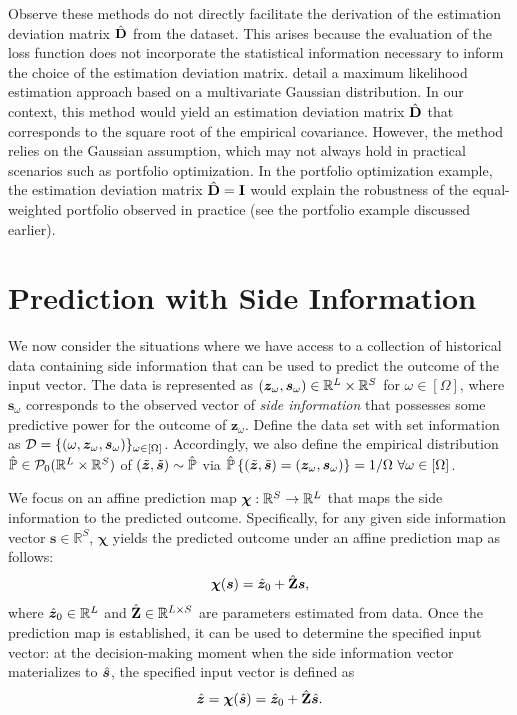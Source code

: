 \documentclass[opre, nonblindrev]{informswp}
\newcommand{\1}[1]{\mathds{1}{\left(#1\right)}}
\begin{document}
Observe these methods do not directly facilitate the derivation of the estimation deviation matrix ${\hat{\mathbf{D}}}$ from the dataset. This arises because the evaluation of the loss function does not incorporate the statistical information necessary to inform the choice of the estimation deviation matrix. \cite{Zhu_Xie_Sim_2021joint} detail a maximum likelihood estimation approach based on a multivariate Gaussian distribution. In our context, this method would yield an estimation deviation matrix ${\hat{\mathbf{D}}}$ that corresponds to the square root of the empirical covariance. However, the method relies on the Gaussian assumption, which may not always hold in practical scenarios such as portfolio optimization. In the portfolio optimization example, the estimation deviation matrix ${\hat{\mathbf{D}}} = {\mathbf{I}}$ would explain the robustness of the equal-weighted portfolio observed in practice (see the portfolio example discussed earlier).

\section{Prediction with Side Information}
\label{sec:prediction_with_side_info}

We now consider the situations where we have access to a collection of historical data containing side information that can be used to predict the outcome of the input vector. The data is represented as $(\bm{z}_\omega, \bm s_\omega) \in \mathbb{R}^L \times \mathbb{R}^S$ for $\omega \in [\Omega]$, where $\bm{s}_\omega$ corresponds to the observed vector of \textit{side information} that possesses some predictive power for the outcome of $\bm z_\omega$. Define the data set with set information as $\mathcal{D} = \{(\omega,\bm z_\omega,\bm s_\omega)\}_{\omega  \in [\Omega]}$. Accordingly, we also define the empirical distribution $\hat{\mathbb{P}} \in \mathcal{P}_0(\mathbb{R}^L\times \mathbb{R}^S )$ of $(\tilde{\bm{z}},\tilde{\bm{s}}) \sim \hat{\mathbb{P}}$ via $\hat{\mathbb{P}}\left\{(\tilde{\bm{z}},\tilde{\bm{s}}) = (\bm z_\omega,\bm s_\omega) \right\} = 1/\Omega ~\forall \omega  \in [\Omega]$. 

We focus on an affine prediction map $\bm \chi:\mathbb{R}^S\rightarrow \mathbb{R}^L$ that maps the side information to the predicted outcome. Specifically, for any given side information vector $\bm s \in \mathbb{R}^S$, $\bm \chi$ yields the predicted outcome under an affine prediction map as follows:
$$
\bm \chi(\bm s) = \hat{\bm{z}}_0 + {\hat{\mathbf{Z}}} \bm s,
$$ 
where $\hat{\bm{z}}_0 \in \mathbb{R}^{L}$ and ${\hat{\mathbf{Z}}} \in \mathbb{R}^{L\times S}$ are parameters estimated from data. Once the prediction map is established, it can be used to determine the specified input vector: at the decision-making moment when the side information vector materializes to $\hat{\bm{s}}$, the specified input vector is defined as 
$$
\hat{\bm{z}} = \bm \chi(\hat{\bm{s}}) = \hat{\bm{z}}_0 + {\hat{\mathbf{Z}}} \hat{\bm{s}}.
$$
\end{document}
